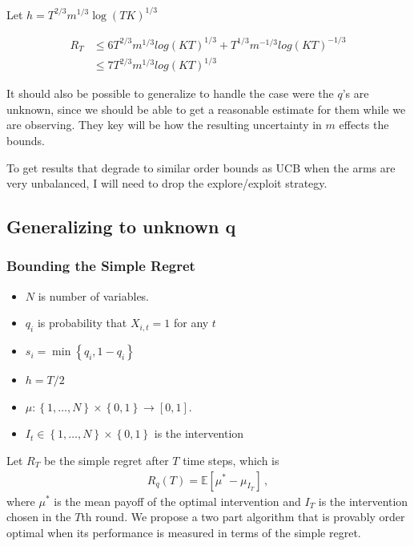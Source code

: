 \documentclass{article}
\newcommand{\E}{\mathbb E}
\newcommand{\set}[1]{\left\{#1\right\}}
\newcommand{\eqn}[1]{\begin{align}#1\end{align}}
\newcommand{\eq}[1]{\begin{align*}#1\end{align*}}
\theoremstyle{plain}
\theoremstyle{definition}
\begin{document}
Let $h = T^{2/3}m^{1/3}\log(TK)^{1/3}$


\eqn {
R_T & \leq 6T^{2/3}m^{1/3}log(KT)^{1/3} + T^{1/3}m^{-1/3}log(KT)^{-1/3}\\ 
& \leq 7T^{2/3}m^{1/3}log(KT)^{1/3}
}



It should also be possible to generalize to handle the case were the $q$'s are unknown, since we should be able to get a reasonable estimate for them while we are observing. They key will be how the resulting uncertainty in $m$ effects the bounds. 

To get results that degrade to similar order bounds as UCB when the arms are very unbalanced, I will need to drop the explore/exploit strategy. 


\subsection{Generalizing to unknown q}

\subsubsection{Bounding the Simple Regret}

\begin{itemize}
\item $N$ is number of variables.
\item $q_i$ is probability that $X_{i,t} = 1$ for any $t$
\item $s_i = \min\set{q_i, 1 - q_i}$
\item $h = T/2$
\item $\mu : \set{1,\ldots,N} \times \set{0,1} \to [0,1]$.
\item $I_t \in \set{1,\ldots,N} \times \set{0,1}$ is the intervention
\end{itemize}

Let $R_T$ be the simple regret after $T$ time steps, which is
\eq{
R_q(T) = \E\left[\mu^* - \mu_{I_T}\right]\,,
}
where $\mu^*$ is the mean payoff of the optimal intervention and $I_T$ is the intervention chosen in the $T$th round.
We propose a two part algorithm that is provably order optimal when its performance is measured in terms of the simple regret.
\end{document}
